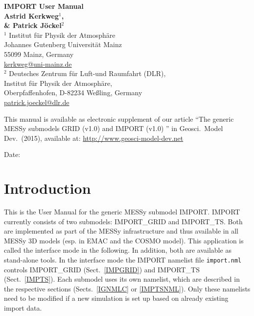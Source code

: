 \documentclass[11pt,twoside]{report}
\begin{document}
\thispagestyle{empty}
\vspace*{2cm}
\begin{center}
  {\Huge\bf IMPORT User Manual}\\[12mm]
\vspace*{2cm}
  {\huge\bf Astrid Kerkweg$^1$, }\\[3mm]
  {\huge\bf \& Patrick J\"ockel$^2$}\\[9mm]
  \Large
\vspace*{1.5cm}
  $^1$ Institut f\"ur Physik der Atmosph\"are\\
  Johannes Gutenberg Universit\"at Mainz\\
  55099 Mainz, Germany\\
  \url{kerkweg@uni-mainz.de} \\

  $^2$ Deutsches Zentrum f\"ur Luft-und Raumfahrt (DLR),\\
   Institut f\"ur Physik der Atmosph\"are, \\
    Oberpfaffenhofen, D-82234 We\ss ling, Germany \\
  \url{patrick.joeckel@dlr.de}


\end{center}

\vfill
{\large This manual is available as electronic supplement of our article
  ``The generic MESSy submodels GRID (v1.0) and IMPORT (v1.0) '' 
  in Geosci.\ Model Dev.\ 
  (2015), available at: \url{http://www.geosci-model-dev.net}}

\begin{center}
Date: \filedate
\end{center}

\newpage %

\sloppy

\tableofcontents
\clearpage


 \chapter{Introduction}
This is the User Manual for the generic MESSy submodel IMPORT.
IMPORT currently consists of two submodels: IMPORT\_GRID and IMPORT\_TS.
Both are implemented as part of the MESSy infrastructure and thus
available in all  
MESSy 3D models (esp. in EMAC and the COSMO model). 
This application is called the interface mode in the following.
 In addition, both are available as stand-alone tools. 
In the interface mode the IMPORT namelist file \verb|import.nml|
controls IMPORT\_GRID (Sect.~\ref{IMPGRID}) and IMPORT\_TS
(Sect.~\ref{IMPTS}). Each submodel
uses its own namelist, which are described in the respective 
 sections (Sects.~\ref{IGNMLC} or \ref{IMPTSNML}). Only these
 namelists need to be modified if a new simulation is set up based on
 already existing import data.
\end{document}

